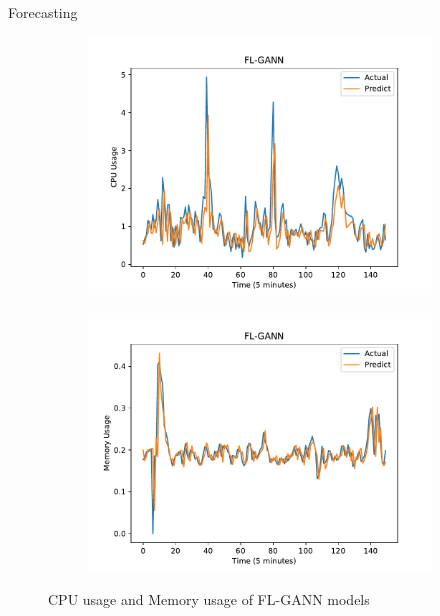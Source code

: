 \documentclass{beamer}
\begin{document}
\begin{frame}{Forecasting}
	\begin{figure}
		\centering
		\begin{subfigure}{0.5\textwidth}
			\centering
			\includegraphics[width=1.0\linewidth]{multi_cpu_flgann.pdf}
			\label{fig:sub11}
		\end{subfigure}%
		\begin{subfigure}{.5\textwidth}
			\centering
			\includegraphics[width=1.0\linewidth]{multi_ram_flgann.pdf}
			\label{fig:sub21}
		\end{subfigure}%
		\caption{CPU usage and Memory usage of FL-GANN models}
		\label{fig:cpu_predict}
	\end{figure}

\end{frame}
\end{document}

